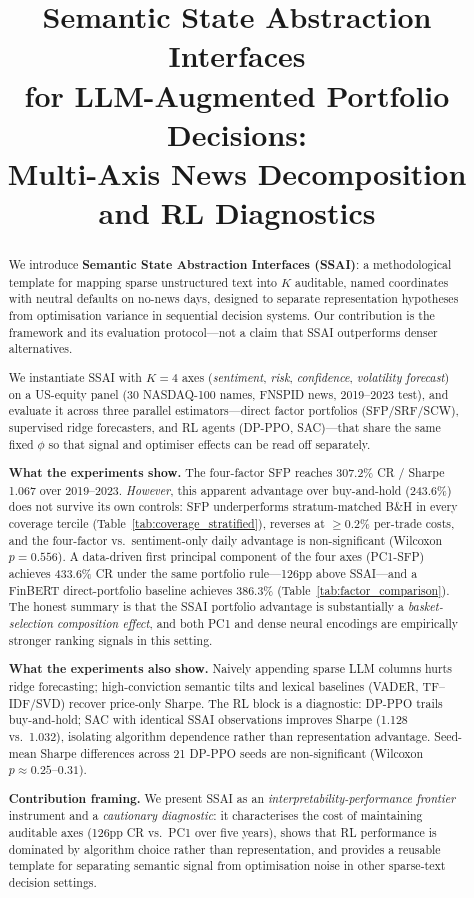 \documentclass{article}
\title{%
  Semantic State Abstraction Interfaces\\
  for LLM-Augmented Portfolio Decisions:\\
  Multi-Axis News Decomposition and RL Diagnostics
}
\author{\HalAuthorBlock}
\author{}
\begin{document}
\maketitle

\begin{abstract}
We introduce \textbf{Semantic State Abstraction Interfaces (SSAI)}: a methodological template for mapping sparse unstructured text into $K$ auditable, named coordinates with neutral defaults on no-news days, designed to separate representation hypotheses from optimisation variance in sequential decision systems.
Our contribution is the framework and its evaluation protocol---not a claim that SSAI outperforms denser alternatives.

We instantiate SSAI with $K{=}4$ axes (\emph{sentiment}, \emph{risk}, \emph{confidence}, \emph{volatility forecast}) on a US-equity panel (30 NASDAQ-100 names, FNSPID news, 2019--2023 test), and evaluate it across three parallel estimators---direct factor portfolios (SFP/SRF/SCW), supervised ridge forecasters, and RL agents (DP-PPO, SAC)---that share the same fixed $\phi$ so that signal and optimiser effects can be read off separately.

\textbf{What the experiments show.}
The four-factor SFP reaches 307.2\% CR / Sharpe 1.067 over 2019--2023.
\emph{However}, this apparent advantage over buy-and-hold (243.6\%) does not survive its own controls: SFP underperforms stratum-matched B\&H in every coverage tercile (Table~\ref{tab:coverage_stratified}), reverses at ${\geq}0.2$\% per-trade costs, and the four-factor vs.\ sentiment-only daily advantage is non-significant (Wilcoxon $p{=}0.556$).
A data-driven first principal component of the four axes (PC1-SFP) achieves 433.6\% CR under the same portfolio rule---126pp above SSAI---and a FinBERT direct-portfolio baseline achieves 386.3\% (Table~\ref{tab:factor_comparison}).
The honest summary is that the SSAI portfolio advantage is substantially a \emph{basket-selection composition effect}, and both PC1 and dense neural encodings are empirically stronger ranking signals in this setting.

\textbf{What the experiments also show.}
Naively appending sparse LLM columns hurts ridge forecasting; high-conviction semantic tilts and lexical baselines (VADER, TF--IDF/SVD) recover price-only Sharpe.
The RL block is a diagnostic: DP-PPO trails buy-and-hold; SAC with identical SSAI observations improves Sharpe (1.128 vs.\ 1.032), isolating algorithm dependence rather than representation advantage.
Seed-mean Sharpe differences across 21 DP-PPO seeds are non-significant (Wilcoxon $p{\approx}0.25$--$0.31$).

\textbf{Contribution framing.}
We present SSAI as an \emph{interpretability-performance frontier} instrument and a \emph{cautionary diagnostic}: it characterises the cost of maintaining auditable axes (126pp CR vs.\ PC1 over five years), shows that RL performance is dominated by algorithm choice rather than representation, and provides a reusable template for separating semantic signal from optimisation noise in other sparse-text decision settings.
\end{abstract}
\end{document}
